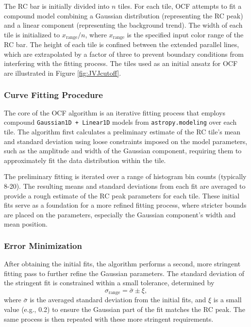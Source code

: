 \documentclass[twocolumn]{aastex631}
\begin{document}
The RC bar is initially divided into $n$ tiles. For each tile, OCF attempts to
fit a compound model combining a Gaussian distribution (representing the RC
peak) and a linear component (representing the background trend). The width of
each tile is initialized to $x_{\text{range}} / n$, where $x_{\text{range}}$ is
the specified input color range of the RC bar. The height of each tile is
confined between the extended parallel lines, which are extrapolated by a factor
of three to prevent boundary conditions from interfering with the fitting
process. The tiles used as an initial ansatz for OCF are illustrated in Figure
\ref{fig:JVJcutoff}.

\subsubsection{Curve Fitting Procedure}

The core of the OCF algorithm is an iterative fitting process that employs
compound \verb|Gaussian1D + Linear1D| models from \verb|astropy.modeling| over
each tile. The algorithm first calculates a preliminary estimate of the RC
tile's mean and standard deviation using loose constraints imposed on the model
parameters, such as the amplitude and width of the Gaussian component, requiring
them to approximately fit the data distribution within the tile.

The preliminary fitting is iterated over a range of histogram bin counts
(typically 8-20). The resulting means and standard deviations from each fit are
averaged to provide a rough estimate of the RC peak parameters for each tile.
These initial fits serve as a foundation for a more refined fitting process,
where stricter bounds are placed on the parameters, especially the Gaussian
component's width and mean position.

\subsubsection{Error Minimization}

After obtaining the initial fits, the algorithm performs a second, more
stringent fitting pass to further refine the Gaussian parameters. The standard
deviation of the stringent fit is constrained within a small tolerance,
determined by
\[
    \sigma_{\text{range}} = \bar{\sigma} \pm \xi,
\]
where $\bar{\sigma}$ is the averaged standard deviation from the initial fits,
and $\xi$ is a small value (e.g., 0.2) to ensure the Gaussian part of the fit
matches the RC peak. The same process is then repeated with these more stringent
requirements.
\end{document}
